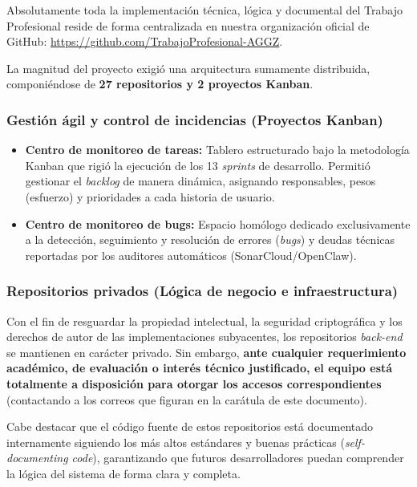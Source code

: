 Absolutamente toda la implementación técnica, lógica y documental del Trabajo Profesional reside de forma centralizada en nuestra organización oficial de GitHub: \url{https://github.com/TrabajoProfesional-AGGZ}. 

La magnitud del proyecto exigió una arquitectura sumamente distribuida, componiéndose de \textbf{27 repositorios y 2 proyectos Kanban}.

\subsubsection{Gestión ágil y control de incidencias (Proyectos Kanban)}
\begin{itemize}
    \item \textbf{Centro de monitoreo de tareas:} Tablero estructurado bajo la metodología Kanban que rigió la ejecución de los 13 \textit{sprints} de desarrollo. Permitió gestionar el \textit{backlog} de manera dinámica, asignando responsables, pesos (esfuerzo) y prioridades a cada historia de usuario.
    \item \textbf{Centro de monitoreo de bugs:} Espacio homólogo dedicado exclusivamente a la detección, seguimiento y resolución de errores (\textit{bugs}) y deudas técnicas reportadas por los auditores automáticos (SonarCloud/OpenClaw).
\end{itemize}

\subsubsection{Repositorios privados (Lógica de negocio e infraestructura)}
Con el fin de resguardar la propiedad intelectual, la seguridad criptográfica y los derechos de autor de las implementaciones subyacentes, los repositorios \textit{back-end} se mantienen en carácter privado. Sin embargo, \textbf{ante cualquier requerimiento académico, de evaluación o interés técnico justificado, el equipo está totalmente a disposición para otorgar los accesos correspondientes} (contactando a los correos que figuran en la carátula de este documento).

Cabe destacar que el código fuente de estos repositorios está documentado internamente siguiendo los más altos estándares y buenas prácticas (\textit{self-documenting code}), garantizando que futuros desarrolladores puedan comprender la lógica del sistema de forma clara y completa.

